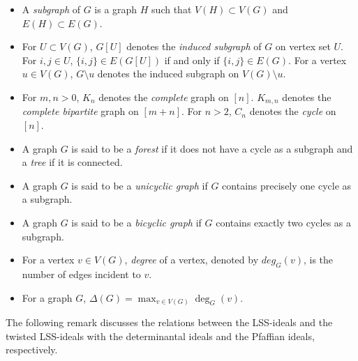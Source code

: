 \documentclass[11pt,a4paper,reqno]{amsart}
\theoremstyle{definition}
\numberwithin{equation}{section}
\begin{document}
\vspace{2mm}

\begin{itemize}
    \item A \textit{subgraph} of $G$ is a graph $H$ such that $V(H) \subset V(G)$ and $E(H) \subset E(G)$.
    \item For $U \subset V(G)$, $G[U]$ denotes the \textit{induced subgraph} of $G$ on vertex set $U$. For $i,j \in U$, $\{i,j\} \in E(G[U])$ if and only if $\{i,j\} \in E(G)$. For a vertex $u \in V(G)$, $G \setminus u$ denotes the induced subgraph on $V(G) \setminus u$.
    \item For $m,n >0$, $K_n$ denotes the \textit{complete} graph on $[n]$. $K_{m,n}$ denotes the \textit{complete bipartite} graph on $[m+n]$. For $n>2$, $C_n$ denotes the \textit{cycle} on $[n]$.
    \item A graph $G$ is said to be a \textit{forest} if it does not have a cycle as a subgraph and a \textit{tree} if it is connected.
    \item A graph $G$ is said to be a \textit{unicyclic graph} if $G$ contains precisely one cycle as a subgraph.
    \item A graph $G$ is said to be a \textit{bicyclic graph} if $G$ contains exactly two cycles as a subgraph.
    \item For a vertex $v \in V(G)$, \textit{degree} of a vertex, denoted by $deg_{G}(v)$, is the number of edges incident to $v$.
    \item For a graph $G$, $\Delta(G)= \max_{v\in V(G)} \deg_G(v)$. 
\end{itemize}


   

\vspace{2mm}


The following remark discusses the relations between the LSS-ideals and the twisted LSS-ideals with the determinantal ideals and the Pfaffian ideals, respectively.  
\end{document}
